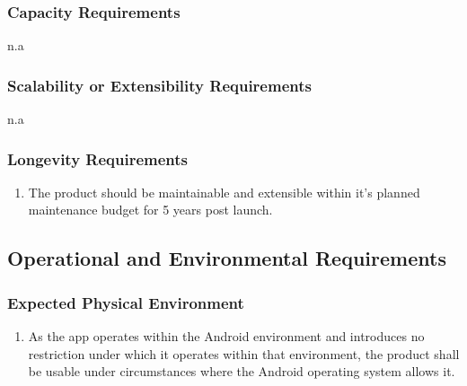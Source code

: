 \documentclass[]{article}
\begin{document}
\subsubsection{Capacity Requirements}
\label{ssub:capacity_requirements}
n.a

\subsubsection{Scalability or Extensibility Requirements}
\label{ssub:scalability_or_extensibility_requirements}
n.a

\subsubsection{Longevity Requirements}
\label{ssub:longevity_requirements}
\begin{enumerate}[{PR}1. ]
	\resumeEnum
	\item The product should be maintainable and extensible within it's planned maintenance budget for 5 years post launch.
\end{enumerate}


\subsection{Operational and Environmental Requirements}
\label{sub:operational_and_environmental_requirements}

\subsubsection{Expected Physical Environment}
\label{ssub:expected_physical_environment}
\begin{enumerate}[{OE}1. ]
	\item As the app operates within the Android environment and introduces no restriction under which it operates within that environment, the product shall be usable under circumstances where the Android operating system allows it.
	\holdEnum
\end{enumerate}
\end{document}
